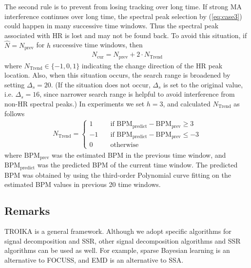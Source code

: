 \documentclass[10pt,twocolumn]{IEEEtran}
\begin{document}
The second  rule is to prevent from losing tracking over long time. If strong MA interference continues over long time, the spectral peak selection by (\ref{eq:case3}) could happen in many successive time windows. Thus the spectral peak  associated with  HR is  lost and may not be found back. To avoid this situation, if $\widehat{N} = N_{\mathrm{prev}}$ for $h$ successive time windows, then
\begin{eqnarray}
N_{\mathrm{cur}} = N_{\mathrm{prev}} + 2 \cdot N_{\mathrm{Trend}}
\end{eqnarray}
where $N_{\mathrm{Trend}} \in \{-1, 0, 1\}$ indicating the change direction of the HR peak location. Also, when this situation occurs,  the search range is broadened by setting $\Delta_s = 20$. (If the situation does not occur, $\Delta_s$ is set to the original value, i.e. $\Delta_s=16$, since narrower search range is helpful to avoid interference from non-HR spectral peaks.) In  experiments we set $h=3$, and calculated $N_{\mathrm{Trend}}$ as follows
\begin{eqnarray}
N_{\mathrm{Trend}} =
\left\{
\begin{array}{ll}
1  & \quad \textrm{if $\mathrm{BPM}_{\mathrm{predict}} - \mathrm{BPM}_{\mathrm{prev}} \geq 3$}   \\
-1  & \quad \textrm{if $\mathrm{BPM}_{\mathrm{predict}} - \mathrm{BPM}_{\mathrm{prev}} \leq -3$}   \\
0  & \quad \mathrm{otherwise}
\end{array} \right.
\end{eqnarray}
where $\mathrm{BPM}_{\mathrm{prev}}$ was the estimated BPM in the previous time window, and $\mathrm{BPM}_{\mathrm{predict}}$ was the predicted BPM of the current time window. The predicted BPM was obtained by using the third-order Polynomial curve fitting on the estimated BPM values in previous 20 time windows.








\subsection{Remarks}


TROIKA is a general framework. Although we adopt specific algorithms for signal decomposition and SSR, other signal decomposition algorithms and SSR algorithms can be used as well. For example, sparse Bayesian learning \cite{Zhang2013TSP} is an alternative to FOCUSS, and EMD is an alternative to SSA.
\end{document}
